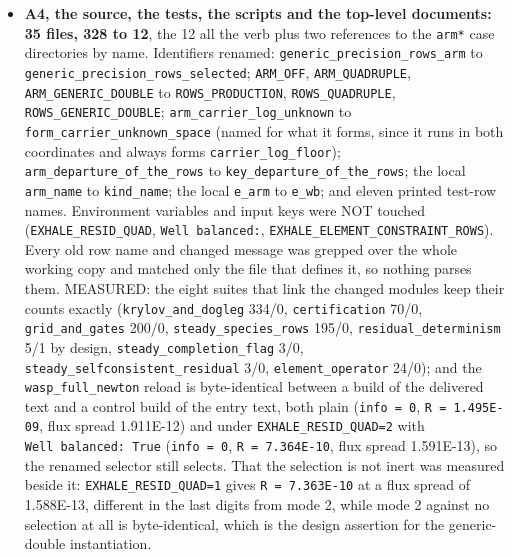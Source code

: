\documentclass[english,a4paper]{my_memo}
\begin{document}
\begin{itemize}
  VLT/UVES" is the spectrograph\textquotesingle s own blue arm and its "spiral arms" are the
  outflow\textquotesingle s, both standard astronomy and not the forbidden sense. Nine PDFs were
  rebuilt with every page count unchanged (MEASURED, \texttt{pdfinfo}:
  \texttt{Update\_EXHALE\_stage1} 460, \texttt{EXHALE\_user\_manual} 90,
  \texttt{lhs1140b\_exhale\_vs\_pwinds} 76, and six smaller memos).
\item
  \textbf{A4, the source, the tests, the scripts and the top-level documents: 35 files,
  328 to 12}, the 12 all the verb plus two references to the \texttt{arm*} case
  directories by name. Identifiers renamed:
  \texttt{generic\_precision\_rows\_arm} to \texttt{generic\_precision\_rows\_selected};
  \texttt{ARM\_OFF}, \texttt{ARM\_QUADRUPLE}, \texttt{ARM\_GENERIC\_DOUBLE} to \texttt{ROWS\_PRODUCTION},
  \texttt{ROWS\_QUADRUPLE}, \texttt{ROWS\_GENERIC\_DOUBLE}; \texttt{arm\_carrier\_log\_unknown} to
  \texttt{form\_carrier\_unknown\_space} (named for what it forms, since it runs in both
  coordinates and always forms \texttt{carrier\_log\_floor}); \texttt{arm\_departure\_of\_the\_rows}
  to \texttt{key\_departure\_of\_the\_rows}; the local \texttt{arm\_name} to \texttt{kind\_name}; the local
  \texttt{e\_arm} to \texttt{e\_wb}; and eleven printed test-row names. Environment variables and
  input keys were NOT touched (\texttt{EXHALE\_RESID\_QUAD}, \texttt{Well\ balanced:},
  \texttt{EXHALE\_ELEMENT\_CONSTRAINT\_ROWS}). Every old row name and changed message was
  grepped over the whole working copy and matched only the file that defines it,
  so nothing parses them. MEASURED: the eight suites that link the changed
  modules keep their counts exactly (\texttt{krylov\_and\_dogleg} 334/0, \texttt{certification}
  70/0, \texttt{grid\_and\_gates} 200/0, \texttt{steady\_species\_rows} 195/0,
  \texttt{residual\_determinism} 5/1 by design, \texttt{steady\_completion\_flag} 3/0,
  \texttt{steady\_selfconsistent\_residual} 3/0, \texttt{element\_operator} 24/0); and the
  \texttt{wasp\_full\_newton} reload is byte-identical between a build of the delivered
  text and a control build of the entry text, both plain (\texttt{info\ =\ 0},
  \texttt{\textbar{}\textbar{}R\textbar{}\textbar{}\ =\ 1.495E-09}, flux spread 1.911E-12) and under \texttt{EXHALE\_RESID\_QUAD=2}
  with \texttt{Well\ balanced:\ True} (\texttt{info\ =\ 0}, \texttt{\textbar{}\textbar{}R\textbar{}\textbar{}\ =\ 7.364E-10}, flux spread
  1.591E-13), so the renamed selector still selects. That the selection is not
  inert was measured beside it: \texttt{EXHALE\_RESID\_QUAD=1} gives \texttt{\textbar{}\textbar{}R\textbar{}\textbar{}\ =\ 7.363E-10}
  at a flux spread of 1.588E-13, different in the last digits from mode 2, while
  mode 2 against no selection at all is byte-identical, which is the design
  assertion for the generic-double instantiation.
\end{itemize}
\end{document}
